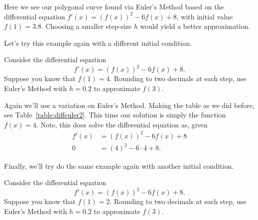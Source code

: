 \begin{marginfigure}[0in]
\caption{Here we see our polygonal curve found via Euler's Method
  based on the differential equation $f'(x) = \left(f(x)\right)^2 -
  6f(x) + 8$, with initial value $f(1) =3.8$.  Choosing a smaller
  step-size $h$ would yield a better approximation.}
\label{figure:eulerDiffEQ}
\end{marginfigure}

Let's try this example again with a different initial condition.


\begin{example}\label{example:slopefield2}
Consider the differential equation
\[
f'(x) = \left(f(x)\right)^2 - 6f(x) + 8.
\]
Suppose you know that $f(1)= 4$. Rounding to two decimals at each
step, use Euler's Method with $h=0.2$ to approximate $f(3)$. 
\end{example}

\begin{solution}
Again we'll use a variation on Euler's Method. Making the table as we
did before, see Table~\ref{table:diffeuler2}.  This time our solution
is simply the function $f(x) = 4$. Note, this does solve the
differential equation as, given
\begin{align*}
f'(x) &= \left(f(x)\right)^2 - 6f(x) + 8\\
0 &= \left(4\right)^2 - 6\cdot4 + 8.
\end{align*}
\end{solution}


Finally, we'll try do the same example again with another initial
condition.


\begin{example}\label{example:slopefield3}
Consider the differential equation
\[
f'(x) = \left(f(x)\right)^2 - 6f(x) + 8.
\]
Suppose you know that $f(1)= 2$. Rounding to two decimals at each
step, use Euler's Method with $h=0.2$ to approximate $f(3)$. 
\end{example}



